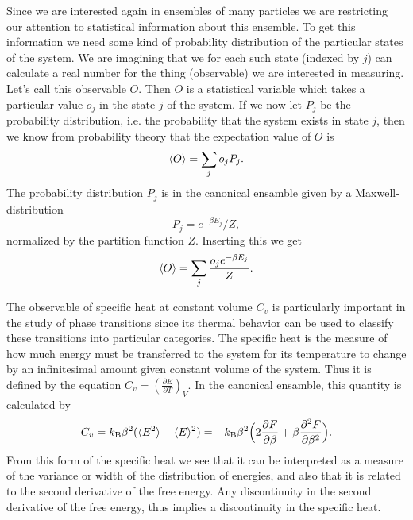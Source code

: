 Since we are interested again in ensembles of many particles we are restricting our attention to statistical
information about this ensemble. To get this information we need some kind of probability distribution of the
particular states of the system. We are imagining that we for each such state (indexed by $j$) can calculate
a real number for the thing (observable) we are interested in measuring. Let's call this observable $O$. Then
$O$ is a statistical variable which takes a particular value $o_j$ in the state $j$ of the system. If we
now let $P_j$ be the probability distribution, i.e. the probability that the system exists in state $j$, then
we know from probability theory that the expectation value of $O$ is
\begin{equation}
    \label{eq:statMech:statMean}
    \langle O \rangle = \sum_jo_jP_j.
\end{equation}
The probability distribution $P_j$ is in the canonical ensamble given by a Maxwell-distribution
\begin{equation}
    \label{eq:statMech:probDist}
    P_j = e^{-\beta E_j}/Z,
\end{equation}
normalized by the partition function $Z$. Inserting this we get
\begin{equation}
    \label{eq:stateMech:statMeanFull}
    \langle O \rangle = \sum_j\frac{o_je^{-\beta E_j}}{Z}.
\end{equation}

The observable of specific heat at constant volume $C_v$ is particularly important in the study of phase transitions
since its thermal
behavior can be used to classify these transitions into particular categories. The specific heat is the measure
of how much energy must be transferred to the system for its temperature to change by an infinitesimal amount
given constant volume of the system. Thus it is defined by the equation $C_v = (\frac{\partial E}{\partial T})_V$.
In the canonical ensamble, this quantity is calculated by
\begin{equation}
    \label{eq:statMech:specificHeat}
    C_v = k_\text{B}\beta^2(\langle E^2 \rangle-\langle E \rangle^2) = -k_\text{B}\beta^2\Big(2\frac{\partial F}{\partial\beta}+\beta\frac{\partial^2 F}{\partial\beta^2}\Big).
\end{equation}
From this form of the specific heat we see that it can be interpreted as a measure of the variance or width of the
distribution of energies, and also that it is related to the second derivative of the free energy. Any discontinuity
in the second derivative of the free energy, thus implies a discontinuity in the specific heat.

